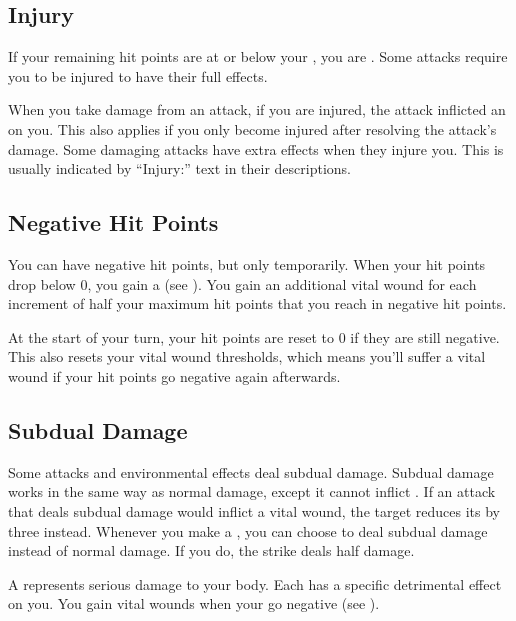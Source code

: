  \subsection{Injury}\label{Injury}
    If your remaining hit points are at or below your , you are .
    Some attacks require you to be injured to have their full effects.

    When you take damage from an attack, if you are injured, the attack inflicted an  on you.
    This also applies if you only become injured after resolving the attack's damage.
    Some damaging attacks have extra effects when they injure you.
    This is usually indicated by ``Injury:'' text in their descriptions.

  \subsection{Negative Hit Points}\label{Negative Hit Points}
    You can have negative hit points, but only temporarily.
    When your hit points drop below 0, you gain a  (see ).
    You gain an additional vital wound for each increment of half your maximum hit points that you reach in negative hit points.

    At the start of your turn, your hit points are reset to 0 if they are still negative.
    This also resets your vital wound thresholds, which means you'll suffer a vital wound if your hit points go negative again afterwards.

  \subsection{Subdual Damage}\label{Subdual Damage}
    Some attacks and environmental effects deal subdual damage.
    Subdual damage works in the same way as normal damage, except it cannot inflict .
    If an attack that deals subdual damage would inflict a vital wound, the target reduces its  by three instead.
    Whenever you make a , you can choose to deal subdual damage instead of normal damage.
    If you do, the strike deals half damage.


  A  represents serious damage to your body.
  Each  has a specific detrimental effect on you.
  You gain vital wounds when your  go negative (see ).

